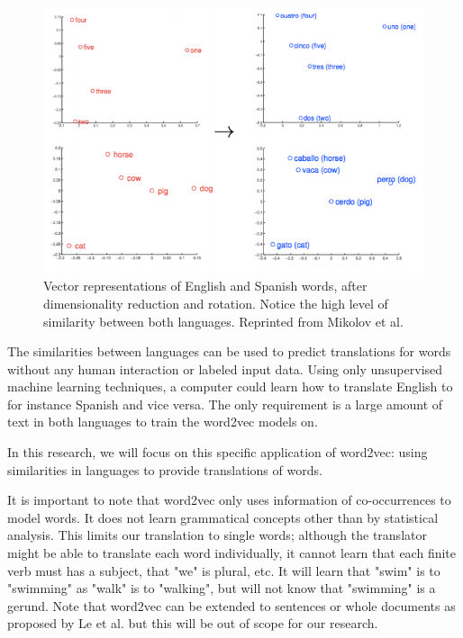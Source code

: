 \begin{figure}[ht!]
  \centering \includegraphics[width=\linewidth]{images/english_spanish}
  \caption{Vector representations of English and Spanish words, after dimensionality reduction and rotation. Notice the high level of similarity between both languages. Reprinted from Mikolov et al.~\cite{mikolov2013exploiting}}
  \label{fig:english_spanish}
\end{figure}

The similarities between languages can be used to predict translations for words without any human interaction or labeled input data. Using only unsupervised machine learning techniques, a computer could learn how to translate English to for instance Spanish and vice versa. The only requirement is a large amount of text in both languages to train the word2vec models on.

In this research, we will focus on this specific application of word2vec: using similarities in languages to provide translations of words.

It is important to note that word2vec only uses information of co-occurrences to model words. It does not learn grammatical concepts other than by statistical analysis. This limits our translation to single words; although the translator might be able to translate each word individually, it cannot learn that each finite verb must has a subject, that "we" is plural, etc. It will learn that "swim" is to "swimming" as "walk" is to "walking", but will not know that "swimming" is a gerund. Note that word2vec can be extended to sentences or whole documents as proposed by Le et al. \cite{le2014distributed} but this will be out of scope for our research.

